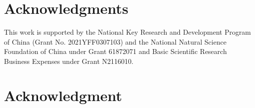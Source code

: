 \documentclass[10pt,journal,compsoc]{IEEEtran}
\begin{document}
\ifCLASSOPTIONcompsoc
  \section*{Acknowledgments}  
  This work is supported by the National Key Research and Development Program of China (Grant No. 2021YFF0307103) and the National Natural Science Foundation of China under Grant 61872071 and Basic Scientific Research Business Expenses under Grant N2116010.
\else
  \section*{Acknowledgment}
\fi




\ifCLASSOPTIONcaptionsoff
  \newpage
\fi





\vspace{-0.2cm}


%
%
%

% 
\end{document}
